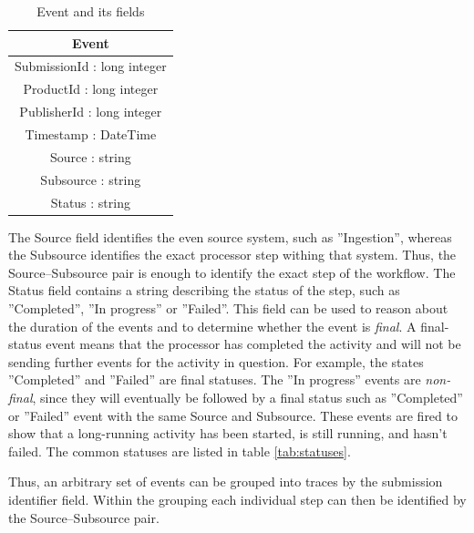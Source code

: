 \begin{table}[htb]
\begin{center}
\begin{tabular}{| c |}
\hline
\textbf{Event} \\
\hline
SubmissionId : long integer\\
ProductId : long integer\\
PublisherId : long integer\\
Timestamp : DateTime\\
Source : string\\
Subsource : string\\
Status : string\\
\hline
\end{tabular}
\end{center}
\caption{Event and its fields}
\label{tab:event}
\end{table}

The Source field identifies the even source system, such as ''Ingestion'', whereas the Subsource identifies the exact processor step withing that system. 
Thus, the Source--Subsource pair is enough to identify the exact step of the workflow. 
The Status field contains a string describing the status of the step, such as ''Completed'', ''In progress'' or ''Failed''. 
This field can be used to reason about the duration of the events and to determine whether the event is \emph{final}. 
A final-status event means that the processor has completed the activity and will not be sending further events for the activity in question.
For example, the states ''Completed'' and ''Failed'' are final statuses.
The ''In progress'' events are \emph{non-final}, since they will eventually be followed by a final status such as ''Completed'' or ''Failed'' event with the same Source and Subsource.
These events are fired to show that a long-running activity has been started, is still running, and hasn't failed.
The common statuses are listed in table \ref{tab:statuses}.

Thus, an arbitrary set of events can be grouped into traces by the submission identifier field. Within the grouping each individual step can then be identified by the Source--Subsource pair.

